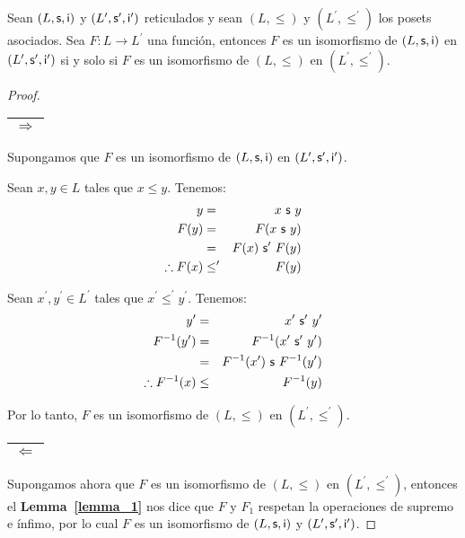   \begin{lemma} \label{lemma_7}
    \PN Sean $(L, \mathsf{s}, \mathsf{i})$ y $(L^{\prime}, \mathsf{s}^{\prime}, \mathsf{i}^{\prime})$ reticulados y sean $(L, \leq)$ y $(L^{\prime}, \leq^{\prime})$ los posets asociados.
    Sea $F: L \rightarrow L^{\prime}$ una función, entonces $F$ es un isomorfismo de $(L, \mathsf{s}, \mathsf{i})$ en $ (L^{\prime}, \mathsf{s}^{\prime}, \mathsf{i}^{\prime})$ si y solo si
    $F$ es un isomorfismo de $(L, \leq)$ en $(L^{\prime}, \leq^{\prime})$.
  \end{lemma}
  \begin{proof}
    \PN \begin{tabular}{|c|} \hline $\Rightarrow$ \\\hline \end{tabular} Supongamos que $F$ es un isomorfismo de
    $(L, \mathsf{s}, \mathsf{i})$ en $ (L^{\prime}, \mathsf{s}^{\prime}, \mathsf{i}^{\prime})$.

    \PN Sean $x, y \in L$ tales que $x \leq y$. Tenemos:
    \begin{eqnarray*}
      y &=& x \ \mathsf{s} \ y \\
      F(y) &=& F(x \ \mathsf{s} \ y) \\
      &=& F(x) \ \mathsf{s}^{\prime} \ F(y) \\
      \therefore F(x) &\leq^{\prime}& F(y)
    \end{eqnarray*}

    \PN Sean $x^{\prime}, y^{\prime} \in L^{\prime}$ tales que $x^{\prime} \leq^{\prime} y^{\prime}$. Tenemos:
    \begin{eqnarray*}
      y^{\prime} &=& x^{\prime} \ \SU^{\prime} \ y^{\prime} \\
      F^{-1}(y^{\prime}) &=& F^{-1}(x^{\prime} \ \SU^{\prime} \ y^{\prime}) \\
      &=& F^{-1}(x^{\prime}) \ \SU \ F^{-1}(y^{\prime}) \\
      \therefore F^{-1}(x) &\leq& F^{-1}(y)
    \end{eqnarray*}

    \PN Por lo tanto, $F$ es un isomorfismo de $(L, \leq)$ en $(L^{\prime}, \leq^{\prime})$.

    \PN \begin{tabular}{|c|} \hline $\Leftarrow$ \\\hline \end{tabular} Supongamos ahora que $F$ es un isomorfismo
    de $(L, \leq)$ en $(L^{\prime}, \leq^{\prime})$, entonces el \textbf{Lemma~\ref{lemma_1}} nos dice que $F$ y
    $F_{1}$ respetan la operaciones de supremo e ínfimo, por lo cual $F$ es un isomorfismo de $(L, \mathsf{s}, \mathsf{i})$ y
    $(L^{\prime}, \mathsf{s}^{\prime}, \mathsf{i}^{\prime})$.
  \end{proof}

